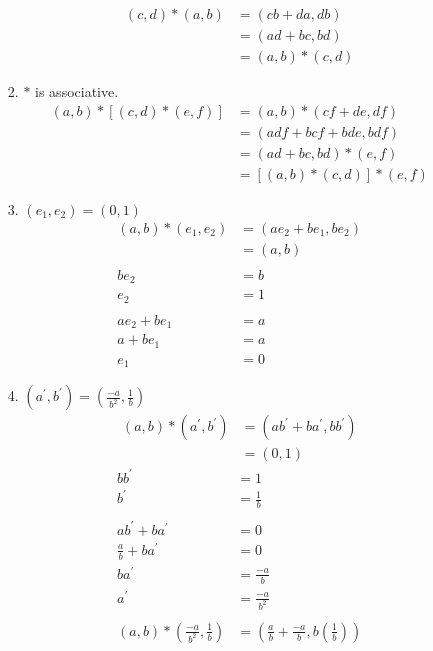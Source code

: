 \begin{enumerate}[label={\Alph*.},font={\bfseries}]
\begin{enumerate}[label={\arabic*},font={\bfseries}]
\begin{enumerate}[label={(\roman*)}]
      \begin{align*}
        (c,d) * (a,b) &= (cb+da,db) \\
        &= (ad+bc,bd) \\
        &= (a,b) * (c,d)
      \end{align*}
    \item $*$ is associative.
      \begin{align*}
        (a,b) * \left[(c,d) * (e,f)\right] &= (a,b) * (cf+de,df) \\
        &= (adf+bcf+bde,bdf) \\
        &= (ad+bc, bd) * (e,f) \\
        &= \left[(a,b) * (c,d)\right] * (e,f)
      \end{align*}
    \item $(e_1,e_2) = (0,1)$
      \begin{align*}
        (a,b) * (e_1,e_2) &= (ae_2 + be_1, be_2) \\
        &= (a,b) \\
        \\
        be_2 &= b \\
        e_2 &= 1 \\
        \\
        ae_2 + be_1 &= a \\
        a + be_1 &= a \\
        e_1 &= 0
      \end{align*}
    \item $(a^\prime,b^\prime) = \left(\frac{-a}{b^2}, \frac{1}{b}\right)$
      \begin{align*}
        (a,b) * (a^\prime,b^\prime) &= (ab^\prime + ba^\prime, bb^\prime) \\
        &= (0,1)
      \end{align*}
      \begin{align*}
        bb^\prime &= 1 \\
        b^\prime &= \frac{1}{b} \\
        \\
        ab^\prime + ba^\prime &= 0 \\
        \frac{a}{b} + ba^\prime &= 0 \\
        ba^\prime &= \frac{-a}{b} \\
        a^\prime &= \frac{-a}{b^2} \\
        \\
        (a,b) * \left(\frac{-a}{b^2}, \frac{1}{b}\right) &= \left(\frac{a}{b} + \frac{-a}{b}, b\left(\frac{1}{b}\right)\right) \\

\end{align*}
\end{enumerate}
\end{enumerate}
\end{enumerate}
